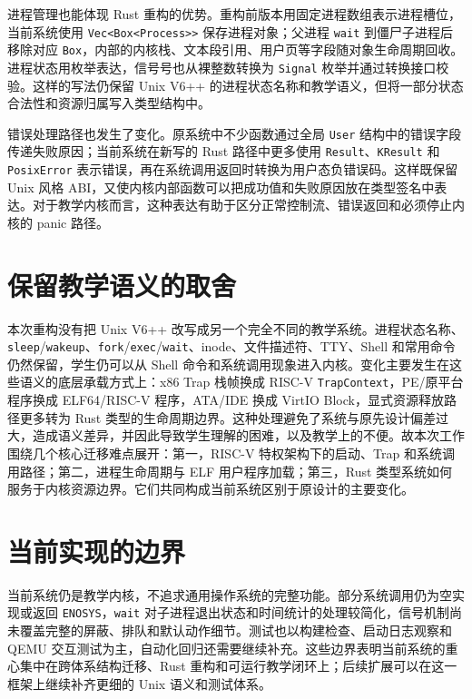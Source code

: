 进程管理也能体现 Rust 重构的优势。重构前版本用固定进程数组表示进程槽位，当前系统使用 \verb|Vec<Box<Process>>| 保存进程对象；父进程 \verb|wait| 到僵尸子进程后移除对应 \verb|Box|，内部的内核栈、文本段引用、用户页等字段随对象生命周期回收。进程状态用枚举表达，信号号也从裸整数转换为 \verb|Signal| 枚举并通过转换接口校验。这样的写法仍保留 Unix V6++ 的进程状态名称和教学语义，但将一部分状态合法性和资源归属写入类型结构中。

错误处理路径也发生了变化。原系统中不少函数通过全局 \verb|User| 结构中的错误字段传递失败原因；当前系统在新写的 Rust 路径中更多使用 \verb|Result|、\verb|KResult| 和 \verb|PosixError| 表示错误，再在系统调用返回时转换为用户态负错误码。这样既保留 Unix 风格 ABI，又使内核内部函数可以把成功值和失败原因放在类型签名中表达。对于教学内核而言，这种表达有助于区分正常控制流、错误返回和必须停止内核的 panic 路径。

\section{保留教学语义的取舍}

本次重构没有把 Unix V6++ 改写成另一个完全不同的教学系统。进程状态名称、\verb|sleep|/\verb|wakeup|、\verb|fork|/\verb|exec|/\verb|wait|、inode、文件描述符、TTY、Shell 和常用命令仍然保留，学生仍可以从 Shell 命令和系统调用现象进入内核。变化主要发生在这些语义的底层承载方式上：x86 Trap 栈帧换成 RISC-V \verb|TrapContext|，PE/原平台程序换成 ELF64/RISC-V 程序，ATA/IDE 换成 VirtIO Block，显式资源释放路径更多转为 Rust 类型的生命周期边界。这种处理避免了系统与原先设计偏差过大，造成语义差异，并因此导致学生理解的困难，以及教学上的不便。故本次工作围绕几个核心迁移难点展开：第一，RISC-V 特权架构下的启动、Trap 和系统调用路径；第二，进程生命周期与 ELF 用户程序加载；第三，Rust 类型系统如何服务于内核资源边界。它们共同构成当前系统区别于原设计的主要变化。

\section{当前实现的边界}

当前系统仍是教学内核，不追求通用操作系统的完整功能。部分系统调用仍为空实现或返回 \verb|ENOSYS|，\verb|wait| 对子进程退出状态和时间统计的处理较简化，信号机制尚未覆盖完整的屏蔽、排队和默认动作细节。测试也以构建检查、启动日志观察和 QEMU 交互测试为主，自动化回归还需要继续补充。这些边界表明当前系统的重心集中在跨体系结构迁移、Rust 重构和可运行教学闭环上；后续扩展可以在这一框架上继续补齐更细的 Unix 语义和测试体系。
